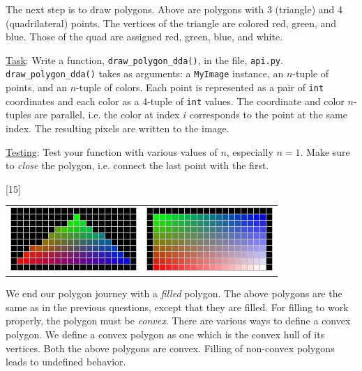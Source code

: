 \documentclass[addpoints]{exam}
\begin{document}
\begin{questions}
  The next step is to draw polygons. Above are polygons with 3 (triangle) and 4 (quadrilateral) points. The vertices of the triangle are colored red, green, and blue. Those of the quad are assigned red, green, blue, and white.
  
  \underline{Task}: Write a function, \texttt{draw\_polygon\_dda()}, in the file, \texttt{api.py}. \texttt{draw\_polygon\_dda()} takes as arguments: a \texttt{MyImage} instance, an $n$-tuple of points, and an $n$-tuple of colors. Each point is represented as a pair of \texttt{int} coordinates and each color as a 4-tuple of \texttt{int} values. The coordinate and color $n$-tuples are parallel, i.e. the color at index $i$ corresponds to the point at the same index. The resulting pixels are written to the image.

  \underline{Testing}: Test your function with various values of $n$, especially $n=1$. Make sure to \textit{close} the polygon, i.e. connect the last point with the first.

  [15]

  \begin{center}
    \begin{tabular}{cc}
      \includegraphics[align=t]{tri-fill} & \includegraphics[align=t]{quad-fill}
    \end{tabular}
  \end{center}

  We end our polygon journey with a \textit{filled} polygon. The above polygons are the same as in the previous questions, except that they are filled. For filling to work properly, the polygon must be \textit{convex}. There are various ways to define a convex polygon. We define a convex polygon as one which is the convex hull of its vertices. Both the above polygons are convex. Filling of non-convex polygons leads to undefined behavior.


\end{questions}
\end{document}
